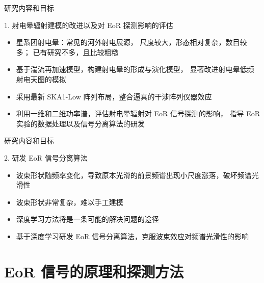 \documentclass{beamer}
\begin{document}
\begin{frame}{研究内容和目标}
  \begin{alertblock}{1. 射电晕辐射建模的改进以及对 EoR 探测影响的评估}
    \begin{itemize}
      \item \alert{星系团射电晕}：常见的河外射电展源，
        尺度较大，形态相对复杂，数目较多；
        已有研究不多，且比较粗糙
      \item 基于\alert{湍流再加速模型}，构建射电晕的形成与演化模型，
        显著改进射电晕低频射电天图的模拟
      \item 采用最新 \alert{SKA1-Low 阵列布局}，整合逼真的干涉阵列仪器效应
      \item 利用一维和二维功率谱，评估射电晕辐射对 EoR 信号探测的影响，
        指导 EoR 实验的数据处理以及信号分离算法的研发
    \end{itemize}
  \end{alertblock}
\end{frame}

\begin{frame}{研究内容和目标}
  \begin{alertblock}{2. 研发 EoR 信号分离算法}
    \begin{itemize}
      \item 波束形状随频率变化，导致原本光滑的前景频谱出现小尺度涨落，破坏频谱光滑性
      \item 波束形状非常复杂，难以手工建模
      \item 深度学习方法将是一条可能的解决问题的途径
      \item 基于深度学习研发 EoR 信号分离算法，克服波束效应对频谱光滑性的影响
    \end{itemize}
  \end{alertblock}
\end{frame}


\section{EoR 信号的原理和探测方法}
\end{document}
